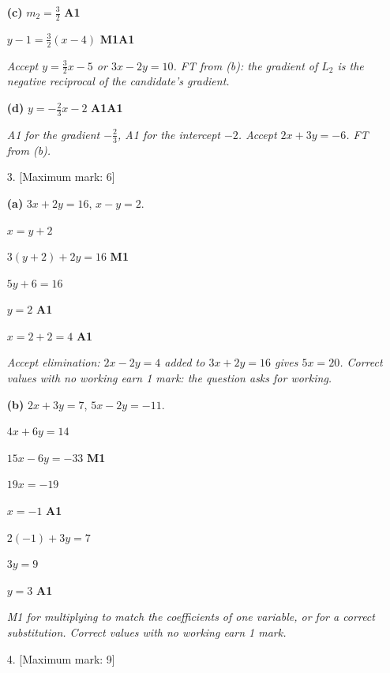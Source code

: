 \documentclass[12pt, twoside]{article}
\begin{document}
\begin{enumerate}[itemsep=0.3cm]
\textbf{(c)} $m_{2} = \frac{3}{2}$ \hfill \textbf{A1}

$y - 1 = \frac{3}{2}(x - 4)$ \hfill \textbf{M1A1}

\emph{Accept $y = \frac{3}{2}x - 5$ or $3x - 2y = 10$. FT from (b): the
gradient of $L_{2}$ is the negative reciprocal of the candidate's gradient.}

\textbf{(d)} $y = -\frac{2}{3}x - 2$ \hfill \textbf{A1A1}

\emph{A1 for the gradient $-\frac{2}{3}$, A1 for the intercept $-2$. Accept
$2x + 3y = -6$. FT from (b).}

\newpage

\item[3.] [Maximum mark: 6]

\textbf{(a)} $3x + 2y = 16$, \; $x - y = 2$.

$x = y + 2$

$3(y + 2) + 2y = 16$ \hfill \textbf{M1}

$5y + 6 = 16$

$y = 2$ \hfill \textbf{A1}

$x = 2 + 2 = 4$ \hfill \textbf{A1}

\emph{Accept elimination: $2x - 2y = 4$ added to $3x + 2y = 16$ gives
$5x = 20$. Correct values with no working earn 1 mark: the question asks
for working.}

\textbf{(b)} $2x + 3y = 7$, \; $5x - 2y = -11$.

$4x + 6y = 14$

$15x - 6y = -33$ \hfill \textbf{M1}

$19x = -19$

$x = -1$ \hfill \textbf{A1}

$2(-1) + 3y = 7$

$3y = 9$

$y = 3$ \hfill \textbf{A1}

\emph{M1 for multiplying to match the coefficients of one variable, or for
a correct substitution. Correct values with no working earn 1 mark.}

\newpage

\item[4.] [Maximum mark: 9]


\end{enumerate}
\end{document}
